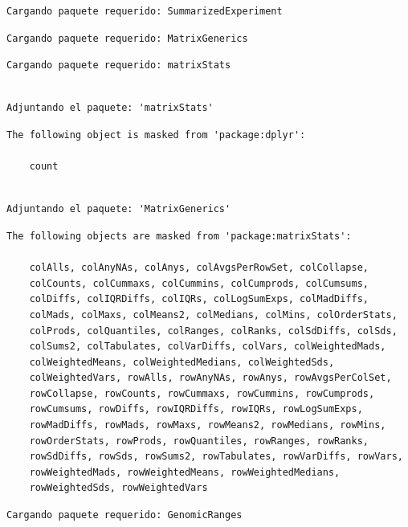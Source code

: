 \documentclass[
  letterpaper,
  DIV=11,
  numbers=noendperiod]{scrartcl}
\begin{document}
\begin{verbatim}
Cargando paquete requerido: SummarizedExperiment
\end{verbatim}

\begin{verbatim}
Cargando paquete requerido: MatrixGenerics
\end{verbatim}

\begin{verbatim}
Cargando paquete requerido: matrixStats
\end{verbatim}

\begin{verbatim}

Adjuntando el paquete: 'matrixStats'
\end{verbatim}

\begin{verbatim}
The following object is masked from 'package:dplyr':

    count
\end{verbatim}

\begin{verbatim}

Adjuntando el paquete: 'MatrixGenerics'
\end{verbatim}

\begin{verbatim}
The following objects are masked from 'package:matrixStats':

    colAlls, colAnyNAs, colAnys, colAvgsPerRowSet, colCollapse,
    colCounts, colCummaxs, colCummins, colCumprods, colCumsums,
    colDiffs, colIQRDiffs, colIQRs, colLogSumExps, colMadDiffs,
    colMads, colMaxs, colMeans2, colMedians, colMins, colOrderStats,
    colProds, colQuantiles, colRanges, colRanks, colSdDiffs, colSds,
    colSums2, colTabulates, colVarDiffs, colVars, colWeightedMads,
    colWeightedMeans, colWeightedMedians, colWeightedSds,
    colWeightedVars, rowAlls, rowAnyNAs, rowAnys, rowAvgsPerColSet,
    rowCollapse, rowCounts, rowCummaxs, rowCummins, rowCumprods,
    rowCumsums, rowDiffs, rowIQRDiffs, rowIQRs, rowLogSumExps,
    rowMadDiffs, rowMads, rowMaxs, rowMeans2, rowMedians, rowMins,
    rowOrderStats, rowProds, rowQuantiles, rowRanges, rowRanks,
    rowSdDiffs, rowSds, rowSums2, rowTabulates, rowVarDiffs, rowVars,
    rowWeightedMads, rowWeightedMeans, rowWeightedMedians,
    rowWeightedSds, rowWeightedVars
\end{verbatim}

\begin{verbatim}
Cargando paquete requerido: GenomicRanges
\end{verbatim}
\end{document}
